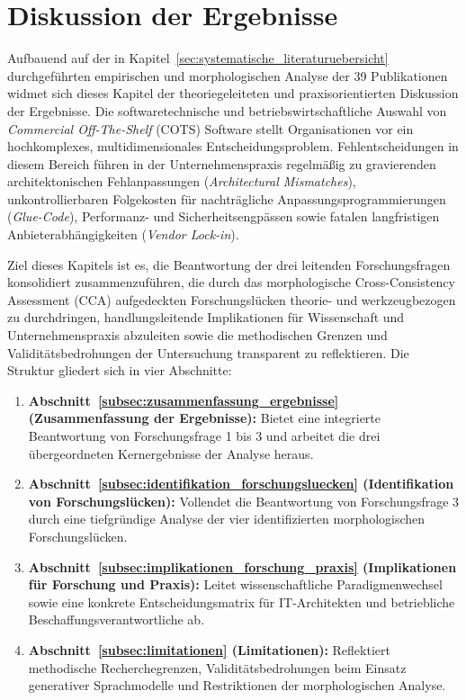 
\section{Diskussion der Ergebnisse}
\label{sec:diskussion_der_ergebnisse}

Aufbauend auf der in Kapitel~\ref{sec:systematische_literaturuebersicht} durchgeführten empirischen und morphologischen Analyse der 39 Publikationen widmet sich dieses  Kapitel der theoriegeleiteten und praxisorientierten Diskussion der Ergebnisse. Die softwaretechnische und betriebswirtschaftliche Auswahl von \textit{Commercial Off-The-Shelf} (COTS) Software stellt Organisationen vor ein hochkomplexes, multidimensionales Entscheidungsproblem. Fehlentscheidungen in diesem Bereich führen in der Unternehmenspraxis regelmäßig zu gravierenden architektonischen Fehlanpassungen (\textit{Architectural Mismatches}), unkontrollierbaren Folgekosten für nachträgliche Anpassungsprogrammierungen (\textit{Glue-Code}), Performanz- und Sicherheitsengpässen sowie fatalen langfristigen Anbieterabhängigkeiten (\textit{Vendor Lock-in}).

Ziel dieses Kapitels ist es, die Beantwortung der drei leitenden Forschungsfragen konsolidiert zusammenzuführen, die durch das morphologische Cross-Consistency Assessment (CCA) aufgedeckten Forschungslücken theorie- und werkzeugbezogen zu durchdringen, handlungsleitende Implikationen für Wissenschaft und Unternehmenspraxis abzuleiten sowie die methodischen Grenzen und Validitätsbedrohungen der Untersuchung transparent zu reflektieren. Die Struktur gliedert sich in vier Abschnitte:
\begin{enumerate}[label=\textbf{\arabic*.}]
  \item \textbf{Abschnitt~\ref{subsec:zusammenfassung_ergebnisse} (Zusammenfassung der Ergebnisse):} Bietet eine integrierte Beantwortung von Forschungsfrage 1 bis 3 und arbeitet die drei übergeordneten Kernergebnisse der Analyse heraus.
  \item \textbf{Abschnitt~\ref{subsec:identifikation_forschungsluecken} (Identifikation von Forschungslücken):} Vollendet die Beantwortung von Forschungsfrage 3 durch eine tiefgründige Analyse der vier identifizierten morphologischen Forschungslücken.
  \item \textbf{Abschnitt~\ref{subsec:implikationen_forschung_praxis} (Implikationen für Forschung und Praxis):} Leitet wissenschaftliche Paradigmenwechsel sowie eine konkrete Entscheidungsmatrix für IT-Architekten und betriebliche Beschaffungsverantwortliche ab.
  \item \textbf{Abschnitt~\ref{subsec:limitationen} (Limitationen):} Reflektiert methodische Recherchegrenzen, Validitätsbedrohungen beim Einsatz generativer Sprachmodelle und Restriktionen der morphologischen Analyse.
\end{enumerate}

